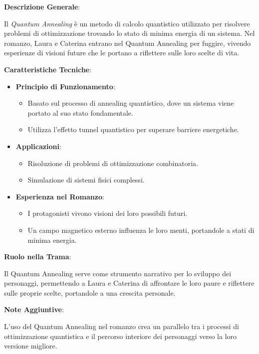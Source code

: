 \vspace{0.5cm}

\begin{tcolorbox}[colback=white,colframe=black,title=\textbf{Quantum Annealing}]
\begin{multicols}{2}
\textbf{Descrizione Generale}:

Il \emph{Quantum Annealing} è un metodo di calcolo quantistico utilizzato per risolvere problemi di ottimizzazione trovando lo stato di minima energia di un sistema. Nel romanzo, Laura e Caterina entrano nel Quantum Annealing per fuggire, vivendo esperienze di visioni future che le portano a riflettere sulle loro scelte di vita.

\textbf{Caratteristiche Tecniche}:

\begin{itemize}
    \item \textbf{Principio di Funzionamento}:
    \begin{itemize}
        \item Basato sul processo di annealing quantistico, dove un sistema viene portato al suo stato fondamentale.
        \item Utilizza l'effetto tunnel quantistico per superare barriere energetiche.
    \end{itemize}
    \item \textbf{Applicazioni}:
    \begin{itemize}
        \item Risoluzione di problemi di ottimizzazione combinatoria.
        \item Simulazione di sistemi fisici complessi.
    \end{itemize}
    \item \textbf{Esperienza nel Romanzo}:
    \begin{itemize}
        \item I protagonisti vivono visioni dei loro possibili futuri.
        \item Un campo magnetico esterno influenza le loro menti, portandole a stati di minima energia.
    \end{itemize}
\end{itemize}

\textbf{Ruolo nella Trama}:

Il Quantum Annealing serve come strumento narrativo per lo sviluppo dei personaggi, permettendo a Laura e Caterina di affrontare le loro paure e riflettere sulle proprie scelte, portandole a una crescita personale.

\textbf{Note Aggiuntive}:

L'uso del Quantum Annealing nel romanzo crea un parallelo tra i processi di ottimizzazione quantistica e il percorso interiore dei personaggi verso la loro versione migliore.

\end{multicols}
\end{tcolorbox}

\vspace{0.5cm}

